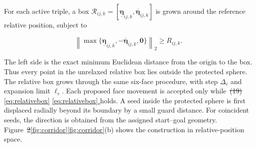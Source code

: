 \documentclass[electronics,article,submit,moreauthors]{Definitions/mdpi}
\newcommand{\norm}[1]{\left\lVert #1\right\rVert}
\providecommand{\DIFadd}[1]{{\protect\color{RevisionBlue}\ifmmode #1\else\uline{#1}\fi}} %
\providecommand{\DIFdel}[1]{{\protect\color{RevisionRed}\ifmmode\text{\sout{\ensuremath{#1}}}\else\sout{#1}\fi}} %
\providecommand{\DIFaddbegin}{}\providecommand{\DIFaddend}{} %
\providecommand{\DIFdelbegin}{}\providecommand{\DIFdelend}{} %
\begin{document}
For each active triple, a box $\mathcal R_{ij,k}=[\underline{\boldsymbol\eta}_{ij,k},\overline{\boldsymbol\eta}_{ij,k}]$ is grown around the reference relative position, subject to

\begin{equation}
 \norm{\max\{\underline{\boldsymbol\eta}_{ij,k},-\overline{\boldsymbol\eta}_{ij,k},\mathbf0\}}_2
 \geq R_{ij,k}.
 \label{eq:relativebox}
\end{equation}

The left side is the exact minimum Euclidean distance from the origin to the box. Thus every point in the unrelaxed relative box lies outside the protected sphere. The relative box grows through the same six-face procedure, with step $\Delta_c$ and expansion limit $\ell_r$. Each proposed face movement is accepted only while~\DIFdelbegin \DIFdel{\mbox{(19)} }\DIFdelend \DIFaddbegin \DIFadd{\eqref{eq:relativebox} }\DIFaddend holds. A seed inside the protected sphere is first displaced radially beyond its boundary by a small guard distance. For coincident seeds, the direction is obtained from the assigned start--goal geometry. Figure~\DIFdelbegin \DIFdel{\mbox{2}}\DIFdelend \DIFaddbegin \DIFadd{\ref{fig:corridor}}\DIFaddend (b) shows the construction in relative-position space.
\end{document}
